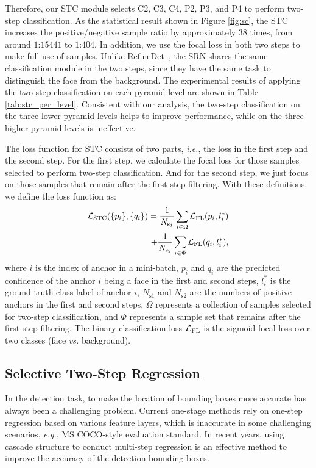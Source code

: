\documentclass[letterpaper]{article} \usepackage{aaai19m}  \usepackage{times}  \usepackage{helvet}  \usepackage{courier}  \usepackage{url}  \usepackage{graphicx}  \usepackage{subfigure}
\def\ie{{\em i.e.}}
\def\eg{{\em e.g.}}
\begin{document}
Therefore, our STC module selects C2, C3, C4, P2, P3, and P4 to perform two-step classification. As the statistical result shown in Figure \ref{fig:sc}, the STC increases the positive/negative sample ratio by approximately $38$ times, from around $1$:$15441$ to $1$:$404$. In addition, we use the focal loss in both two steps to make full use of samples. Unlike RefineDet~\cite{DBLP:journals/corr/abs-1711-06897}, the SRN shares the same classification module in the two steps, since they have the same task to distinguish the face from the background. The experimental results of applying the two-step classification on each pyramid level are shown in Table \ref{tab:stc_per_level}. Consistent with our analysis, the two-step classification on the three lower pyramid levels helps to improve performance, while on the three higher pyramid levels is ineffective.

The loss function for STC consists of two parts, \ie, the loss in the first step and the second step. For the first step, we calculate the focal loss for those samples selected to perform two-step classification. And for the second step, we just focus on those samples that remain after the first step filtering. With these definitions, we define the loss function as:
\begin{equation}
\begin{aligned}
{\cal L}_\text{STC} (\{p_i\},\{q_i\})=\frac{1}{N_{\text{s}_1}}  \sum_{i\in \Omega}{\cal L}_{\text{FL}}(p_i,l_i^\ast) \\
+ \frac{1}{N_{\text{s}_2}}  \sum_{i\in \Phi}{\cal L}_{\text{FL}}(q_i, l_i^\ast),
\end{aligned}
\label{1}
\end{equation}
where $i$ is the index of anchor in a mini-batch, $p_i$ and $q_i$ are the predicted confidence of the anchor $i$ 
being a face in the first and second steps, $l_i^\ast$ is the ground truth class label of anchor $i$, $N_{\text{s1}}$ and $N_{\text{s2}}$ are the numbers of positive anchors in the first and second steps, $\Omega$ represents a collection of samples selected for two-step classification, and $\Phi$ represents a sample set that remains after the first step filtering. The binary classification loss ${\cal L}_{\text{FL}}$ is the sigmoid focal loss over two classes (face {\em vs.} background).


\subsection{Selective Two-Step Regression}
In the detection task, to make the location of bounding boxes more accurate has always been a challenging problem. Current one-stage methods rely on one-step regression based on various feature layers, which is inaccurate in some challenging scenarios, \eg, MS COCO-style evaluation standard. In recent years, using cascade structure \cite{DBLP:journals/corr/abs-1711-06897,DBLP:journals/corr/abs-1712-00726} to conduct multi-step regression is an effective method to improve the accuracy of the detection bounding boxes.
\end{document}
